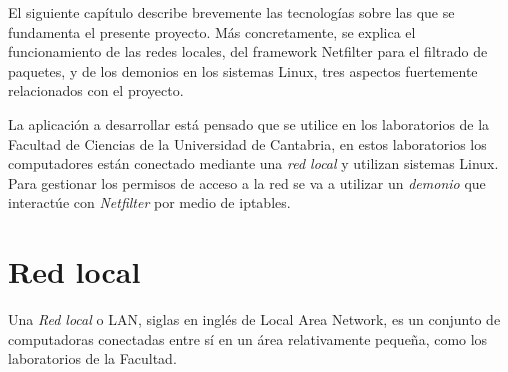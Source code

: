 ﻿%


\label{chap:introduction}


El siguiente cap\'itulo describe brevemente las tecnolog\'ias sobre las que se fundamenta el presente proyecto. M\'as concretamente, se explica el funcionamiento de las redes locales, del framework Netfilter para el filtrado de paquetes, y de los demonios en los sistemas Linux, tres aspectos fuertemente relacionados con el proyecto. \newline

La aplicación a desarrollar está pensado que se utilice en los laboratorios de la Facultad de Ciencias de la Universidad de Cantabria, en estos laboratorios los computadores están conectado mediante una \emph{red local} y utilizan sistemas Linux. Para gestionar los permisos de acceso a la red se va a utilizar un \emph{demonio} que interactúe con \emph{Netfilter} por medio de iptables.


\chaptertoc

\section{Red local}

Una \emph{Red local} o LAN, siglas en inglés de Local Area Network, es un conjunto de computadoras conectadas entre sí en un \'area relativamente peque\~na, como los laboratorios de la Facultad.

